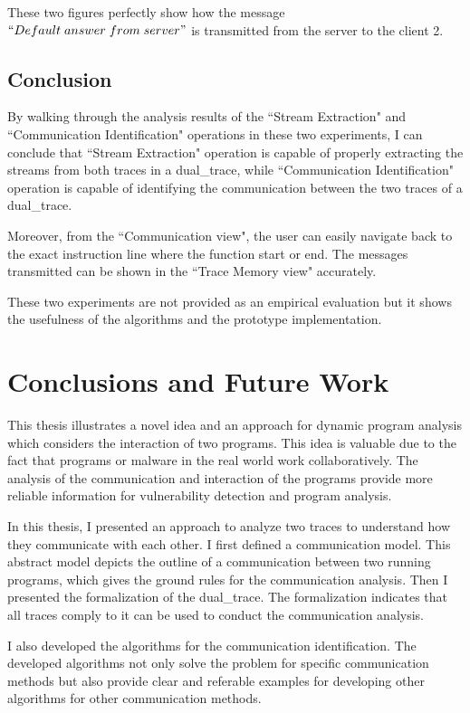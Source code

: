 \documentclass[12pt,oneside]{book}
\newcommand\startchapter[1]{\chapter{#1}\thispagestyle{myheadings}}
\begin{document}
These two figures perfectly show how the message $``Default\; answer\; from\; server"$ is transmitted from the server to the client 2.

\section{Conclusion}
By walking through the analysis results of the ``Stream Extraction" and ``Communication Identification" operations in these two experiments, I can conclude that ``Stream Extraction" operation is capable of properly extracting the streams from both traces in a dual\_trace, while ``Communication Identification" operation is capable of identifying the communication between the two traces of a dual\_trace. 

Moreover, from the ``Communication view", the user can easily navigate back to the exact instruction line where the function start or end. The messages transmitted can be shown in the ``Trace Memory view" accurately.

These two experiments are not provided as an empirical evaluation but it shows the usefulness of the algorithms and the prototype implementation.







   





	\startchapter{Conclusions and Future Work}
\label{concl}
This thesis illustrates a novel idea and an approach for dynamic program analysis which considers the interaction of two programs. This idea is valuable due to the fact that programs or malware in the real world work collaboratively. The analysis of the communication and interaction of the programs provide more reliable information for vulnerability detection and program analysis.

In this thesis, I presented an approach to analyze two traces to understand how they communicate with each other. I first defined a communication model. This abstract model depicts the outline of a communication between two running programs, which gives the ground rules for the communication analysis. Then I presented the  formalization of the dual\_trace. The formalization indicates that all traces comply to it can be used to conduct the communication analysis.

I also developed the algorithms for the communication identification. The developed algorithms not only solve the problem for specific communication methods but also provide clear and referable examples for developing other algorithms for other communication methods.
\end{document}
